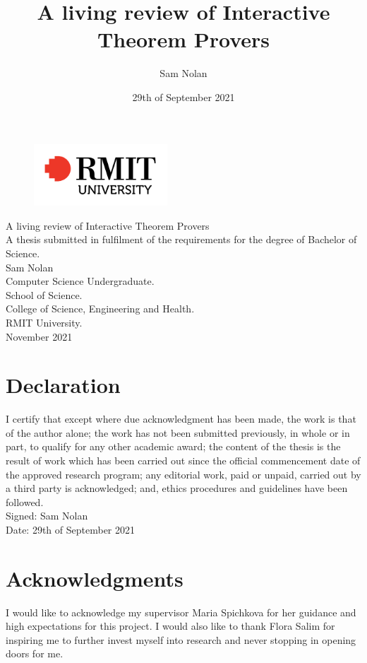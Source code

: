 \documentclass[
]{article}
\title{A living review of Interactive Theorem Provers}
\author{Sam Nolan}
\date{29th of September 2021}
\begin{document}
\begin{titlepage}
\begin{figure}[t!]
\centering
\includegraphics[width=5cm]{Images/rmit-logo.png}
\end{figure}

\vspace*{2cm}

\begin{center}
{\large
  A living review of Interactive Theorem Provers\\
	[1cm]
	A thesis submitted in fulfilment of the requirements for the degree of Bachelor of Science.\\
	[2cm]
	Sam Nolan\\
	[0.5cm]
	Computer Science Undergraduate.\\
	[3cm]
	School of Science.\\
	[0.5cm]
	College of Science, Engineering and Health.\\
	[0.5cm]
	RMIT University.\\
	[2cm]
  November 2021\\
}
\end{center}
	
\end{titlepage}

\section*{Declaration}
I certify that except where due acknowledgment has been made, the work
is that of the author alone; the work has not been submitted previously,
in whole or in part, to qualify for any other academic award; the
content of the thesis is the result of work which has been carried out
since the official commencement date of the approved research program;
any editorial work, paid or unpaid, carried out by a third party is
acknowledged; and, ethics procedures and guidelines have been
followed.\\
[1cm]
Signed: Sam Nolan\\
[1cm]
Date: 29th of September 2021\\

\section*{Acknowledgments}
I would like to acknowledge my supervisor Maria Spichkova for her
guidance and high expectations for this project. I would also like to
thank Flora Salim for inspiring me to further invest myself into
research and never stopping in opening doors for me.
\end{document}
